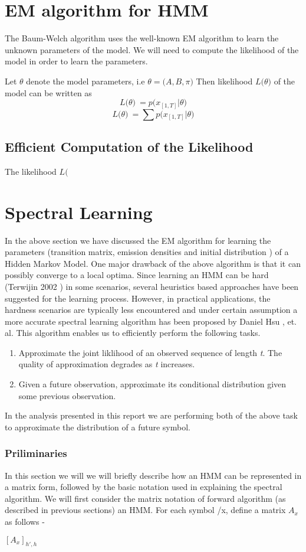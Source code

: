 \documentclass{article} %
\begin{document}
\section{EM algorithm for HMM}
\label{EM algorithm}
The Baum-Welch algorithm uses the well-known EM algorithm to learn the unknown parameters of the model. We will need to compute the likelihood of the model in order to learn the parameters.

Let $\theta$ denote the model parameters, i.e \( \theta = \big(A,B,\pi\big) \)
Then likelihood \(L\big(\theta\big)\) of the model can be written as 
\[L\big(\theta \big)\ = p\big(x_{[1,T]}|\theta \big) \]
\[L\big(\theta \big)\ = \sum p\big(x_{[1,T]}|\theta \big) \]

\subsection{Efficient Computation of the Likelihood}
The likelihood \(L(\)

\section{Spectral Learning}
\label{Spectral Learning}

In the above section we have discussed the EM algorithm for learning the parameters (transition matrix, emission densities and initial distribution ) of a Hidden Markov Model. One major drawback of the above algorithm is that it can possibly converge to a local optima. Since learning an HMM can be hard (Terwijin 2002 ) in some scenarios, several heuristics based approaches have been suggested for the learning process. However, in practical applications, the hardness scenarios are typically less encountered and under certain assumption a more accurate spectral learning algorithm has been proposed by Daniel Hsu , et. al.  This algorithm enables us to efficiently perform the following tasks.
\begin{enumerate}
	\item Approximate the joint liklihood of an observed sequence of length \textit{t}. The quality of approximation degrades as \textit{t} increases.
	\item Given a future observation, approximate its conditional distribution given some previous observation. 
\end{enumerate}
In the analysis presented in this report we are performing both of the above task to approximate the distribution of a future symbol.
\subsubsection{Priliminaries}
In this section we will we will briefly describe how an HMM can be represented in a matrix form, followed by the basic notation used in explaining the spectral algorithm. 
\newline
We will first consider the matrix notation of forward algorithm (as described in previous sections) an HMM. For each symbol /x, define a matrix $A_x$ as follows -
\begin{center}
$[A_x]_{h',h}$
\end{center}
\end{document}
